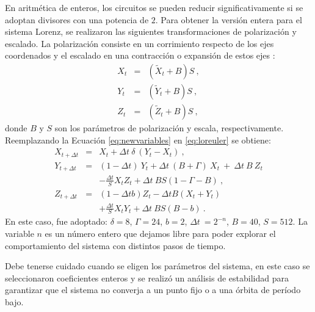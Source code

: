 En aritmética de enteros, los circuitos se pueden reducir significativamente si se adoptan divisores con una potencia de $2$.
Para obtener la versión entera para el sistema Lorenz, se realizaron las siguientes transformaciones de polarización y escalado.
La polarización consiste en un corrimiento respecto de los ejes coordenados y el escalado en una contracción o expansión de estos ejes \cite{Gonzalez2003}:
%
\begin{eqnarray} \label{eq:newvariables}
{X}_{t}&=&\left({\widetilde X}_{t} + B\right)S \ , \nonumber \\
{Y}_{t}&=&\left({\widetilde Y}_{t} + B\right)S \ , \\
{Z}_{t}&=&\left({\widetilde Z}_{t} + B\right)S \ , \nonumber
\end{eqnarray}
%
donde $ B $ y $ S $ son los parámetros de polarización y escala, respectivamente.
Reemplazando la Ecuación \ref {eq:newvariables} en \ref{eq:loreuler} se obtiene:
%
\begin{eqnarray}\label{eq:Lorenz2}
{X}_{t+\Delta t}&=& {X}_{t} + \Delta t \ \delta~\left( {Y}_{t} -
{X}_{t} \right)
\ ,\nonumber \\
{Y}_{t+\Delta t}&=&(1- \Delta t )~{Y}_{t}+ \Delta t \
(B+\Gamma)~{X}_{t}~+~
\Delta t ~B~{Z}_{t} \nonumber\\
&~&-{\frac{\Delta t}{S}}{X}_{t}{Z}_{t}+ \Delta t \ BS(1-\Gamma-B) \ ,\\
{Z}_{t+\Delta t}&=&(1-\Delta t b){Z}_{t}-\Delta t B\left( {X}_{t}
+
{Y}_{t} \right)\nonumber \\
&&+{\frac{\Delta t}{S}}{X}_{t}{Y}_{t}+ \Delta t \ BS(B-b) \ .
\nonumber
\end{eqnarray}
%
En este caso, fue adoptado: $\delta=8$, $\Gamma=24$, $b=2$, $\Delta t \ =2^{-n}$, $B=40$, $S=512$. La variable $n$ es un número entero que dejamos libre para poder explorar el comportamiento del sistema con distintos pasos de tiempo.

Debe tenerse cuidado cuando se eligen los parámetros del sistema, en este caso se seleccionaron coeficientes enteros y se realizó un análisis de estabilidad para garantizar que el sistema no converja a un punto fijo o a una órbita de período bajo.

